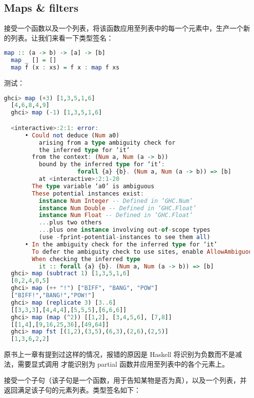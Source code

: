 \documentclass[./main.tex]{subfiles}
\begin{document}
\subsection*{Maps \& filters}

接受一个函数以及一个列表，将该函数应用至列表中的每一个元素中，生产一个新的列表。让我们来看一下类型签名：

\begin{lstlisting}[language=Haskell]
  map :: (a -> b) -> [a] -> [b]
  map _ [] = []
  map f (x : xs) = f x : map f xs
\end{lstlisting}

测试：

\begin{lstlisting}[language=Haskell]
  ghci> map (+3) [1,3,5,1,6]
  [4,6,8,4,9]
  ghci> map (-1) [1,3,5,1,6]

  <interactive>:2:1: error:
      • Could not deduce (Num a0)
          arising from a type ambiguity check for
          the inferred type for ‘it’
        from the context: (Num a, Num (a -> b))
          bound by the inferred type for ‘it’:
                     forall {a} {b}. (Num a, Num (a -> b)) => [b]
          at <interactive>:2:1-20
        The type variable ‘a0’ is ambiguous
        These potential instances exist:
          instance Num Integer -- Defined in ‘GHC.Num’
          instance Num Double -- Defined in ‘GHC.Float’
          instance Num Float -- Defined in ‘GHC.Float’
          ...plus two others
          ...plus one instance involving out-of-scope types
          (use -fprint-potential-instances to see them all)
      • In the ambiguity check for the inferred type for ‘it’
        To defer the ambiguity check to use sites, enable AllowAmbiguousTypes
        When checking the inferred type
          it :: forall {a} {b}. (Num a, Num (a -> b)) => [b]
  ghci> map (subtract 1) [1,3,5,1,6]
  [0,2,4,0,5]
  ghci> map (++ "!") ["BIFF", "BANG", "POW"]
  ["BIFF!","BANG!","POW!"]
  ghci> map (replicate 3) [3..6]
  [[3,3,3],[4,4,4],[5,5,5],[6,6,6]]
  ghci> map (map (^2)) [[1,2], [3,4,5,6], [7,8]]
  [[1,4],[9,16,25,36],[49,64]]
  ghci> map fst [(1,2),(3,5),(6,3),(2,6),(2,5)]
  [1,3,6,2,2]
\end{lstlisting}

原书上一章有提到过这样的情况，报错的原因是 Haskell 将识别为负数而不是减法，需要显式调用
才能识别为 partial 函数并应用至列表中的各个元素上。

接受一个子句（该子句是一个函数，用于告知某物是否为真），以及一个列表，并返回满足该子句的元素列表。类型签名如下：
\end{document}
